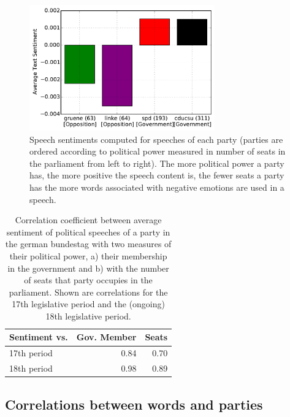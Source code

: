 \documentclass[runningheads,a4paper]{llncs}
\begin{document}
\begin{figure}
\begin{center}
\includegraphics[width=8cm]{images/party-sentiments-18.pdf} 
%
\end{center}
\caption{
\label{fig:party_sentiments}
Speech sentiments computed for speeches of each party (parties are ordered according to political power measured in number of seats in the parliament from left to right). The more political power a party has, the more positive the speech content is, the fewer seats a party has the more words associated with negative emotions are used in a speech. 
}
\end{figure}

\begin{table}[t]
\begin{center}
\begin{tabular}{lrr}
   Sentiment vs. &          Gov. Member    &  Seats\\
\hline\hline
17th period    &  0.84 & 0.70\\
18th period    &  0.98 & 0.89\\
%
\end{tabular}
\end{center}
\caption{
\label{tab:results_avg_political_view}
Correlation coefficient between average sentiment of political speeches of a party in the german bundestag with two measures of their political power, a) their membership in the government and b) with the number of seats that party occupies in the parliament. Shown are correlations for the 17th legislative period and the (ongoing) 18th legislative period.
}
\end{table}



\subsection{Correlations between words and parties}\label{sec:word_party_correlations}
\end{document}
